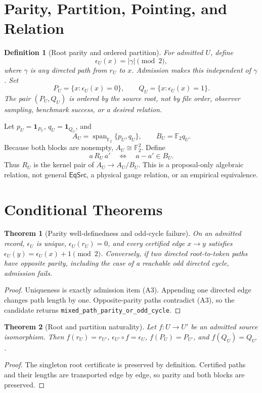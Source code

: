 \documentclass[11pt]{article}
\newtheorem{definition}{Definition}
\newtheorem{theorem}{Theorem}
\newcommand{\Ftwo}{\mathbb F_2}
\begin{document}
\section{Parity, Partition, Pointing, and Relation}

\begin{definition}[Root parity and ordered partition]
For admitted \(U\), define
\[
 \epsilon_U(x)=|\gamma|\pmod 2,
\]
where \(\gamma\) is any directed path from \(r_U\) to \(x\). Admission makes
this independent of \(\gamma\). Set
\[
 P_U=\{x:\epsilon_U(x)=0\},\qquad
 Q_U=\{x:\epsilon_U(x)=1\}.
\]
The pair \((P_U,Q_U)\) is ordered by the source root, not by file order,
observer sampling, benchmark success, or a desired relation.
\end{definition}

Let \(p_U=\mathbf 1_{P_U}\), \(q_U=\mathbf 1_{Q_U}\), and
\[
 A_U=\operatorname{span}_{\Ftwo}\{p_U,q_U\},\qquad
 B_U=\Ftwo q_U.
\]
Because both blocks are nonempty, \(A_U\cong\Ftwo^2\). Define
\[
 a\,R_U\,a'\quad\Longleftrightarrow\quad a-a'\in B_U.
\]
Thus \(R_U\) is the kernel pair of \(A_U\to A_U/B_U\). This is a
proposal-only algebraic relation, not general \(\mathsf{EqSrc}\), a physical
gauge relation, or an empirical equivalence.

\section{Conditional Theorems}

\begin{theorem}[Parity well-definedness and odd-cycle failure]
On an admitted record, \(\epsilon_U\) is unique, \(\epsilon_U(r_U)=0\), and
every certified edge \(x\to y\) satisfies
\(\epsilon_U(y)=\epsilon_U(x)+1\pmod2\). Conversely, if two directed
root-to-token paths have opposite parity, including the case of a reachable
odd directed cycle, admission fails.
\end{theorem}
\begin{proof}
Uniqueness is exactly admission item (A3). Appending one directed edge changes
path length by one. Opposite-parity paths contradict (A3), so the candidate
returns \texttt{mixed\_path\_parity\_or\_odd\_cycle}.
\end{proof}

\begin{theorem}[Root and partition naturality]
Let \(f:U\to U'\) be an admitted source isomorphism. Then
\(f(r_U)=r_{U'}\), \(\epsilon_{U'}\circ f=\epsilon_U\),
\(f(P_U)=P_{U'}\), and \(f(Q_U)=Q_{U'}\).
\end{theorem}
\begin{proof}
The singleton root certificate is preserved by definition. Certified paths
and their lengths are transported edge by edge, so parity and both blocks are
preserved.
\end{proof}
\end{document}
